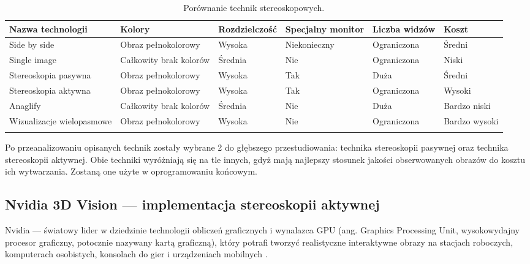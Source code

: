 \begin{table}[H]
\caption{Porównanie technik stereoskopowych.}
\centering
\footnotesize
\label{tab11}
\begin{tabular}{!{\color{sapphire}\vrule width 1pt}m{0.146\textwidth}!{\color{black}\vrule width 1pt}m{0.146\textwidth}!{\color{black}\vrule width 1pt}m{0.146\textwidth}!{\color{black}\vrule width 1pt}m{0.126\textwidth}!{\color{black}\vrule width 1pt}m{0.136\textwidth}!{\color{black}\vrule width 1pt}m{0.126\textwidth}!{\color{sapphire}\vrule width 1pt}}
	\hline
	\Centering\bfseries Nazwa technologii &
	\Centering\bfseries Kolory &
	\Centering\bfseries Rozdzielczość &
	\Centering\bfseries Specjalny monitor &
	\Centering\bfseries Liczba widzów &
	\Centering\bfseries Koszt \\
	\hline
	Side by side & Obraz pełnokolorowy & Wysoka & Niekonieczny & Ograniczona & Średni \\ 
	\hline
	Single image & Całkowity brak kolorów & Średnia & Nie & Ograniczona & Niski \\ 
	\hline
	Stereoskopia pasywna & Obraz pełnokolorowy & Wysoka & Tak & Duża & Średni \\ 
	\hline
	Stereoskopia aktywna & Obraz pełnokolorowy & Wysoka & Tak & Ograniczona & Wysoki \\ 
	\hline
	Anaglify & Całkowity brak kolorów & Średnia & Nie & Duża & Bardzo niski \\ 
	\hline
	Wizualizacje wielopasmowe & Obraz pełnokolorowy & Wysoka & Nie & Ograniczona & Bardzo wysoki \\ 
	\hline
\end{tabular}
\end{table}

Po przeanalizowaniu opisanych technik zostały wybrane 2 do głębszego przestudiowania: technika stereoskopii pasywnej oraz technika stereoskopii aktywnej. Obie techniki wyróżniają się na tle innych, gdyż mają najlepszy stosunek jakości obserwowanych obrazów do kosztu ich wytwarzania. Zostaną one użyte w oprogramowaniu końcowym.

\newpage
\subsection{Nvidia 3D Vision --- implementacja stereoskopii aktywnej}
Nvidia --- światowy lider w dziedzinie technologii obliczeń graficznych i wynalazca GPU (ang. Graphics Processing Unit, wysokowydajny procesor graficzny, potocznie nazywany kartą graficzną), który potrafi tworzyć realistyczne interaktywne obrazy na stacjach roboczych, komputerach osobistych, konsolach do gier i urządzeniach mobilnych \cite{NvidiaInfo}. 

